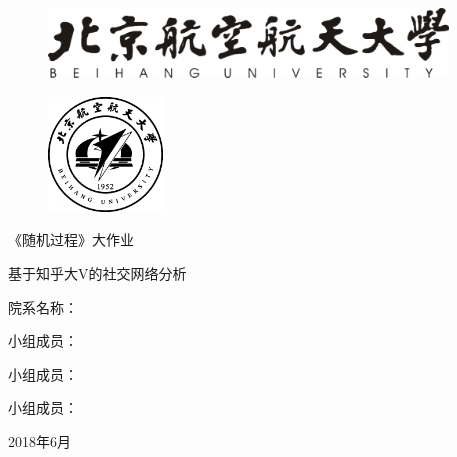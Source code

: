 \documentclass[a4paper]{article}
\begin{document}
\setlength{\parindent}{2em}
\setcounter{page}{0}
\thispagestyle{empty}
\begin{spacing}{3}
\begin{figure}[htp]
\centering
\includegraphics[width=10.6cm]{beihang2.jpg}
\end{figure}

\begin{figure}[htp]
\centering
\includegraphics[width=3.05cm]{beihang1.jpg}
\end{figure}

\bigskip

\begin{center}
{\heiti  {} 《随机过程》大作业}

\vspace{3cm}

{\heiti  {} 基于知乎大V的社交网络分析}
\end{center}
\end{spacing}

\vspace{2cm}

\begin{spacing}{2.25}
\begin{center}

{\heiti {} 院系名称：}\underline{}

{\heiti {} 小组成员：}\underline{}

{\heiti {} {\color{white} 小组成员：}}\underline{}

{\heiti {} {\color{white} 小组成员：}}\underline{}




\vspace{2.5cm}

{\heiti  {} 2018年6月}
\end{center}
\end{spacing}
\end{document}
